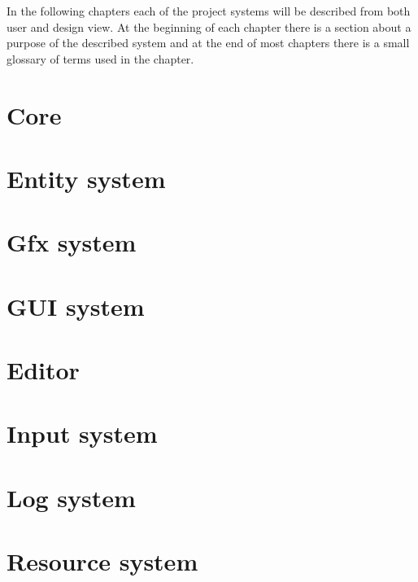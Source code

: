 \documentclass[a4paper, 12pt]{report}
\begin{document}
In the following chapters each of the project systems will be described from both user and design view. At the beginning of each chapter there is a section about a purpose of the described system and at the end of most chapters there is a small glossary of terms used in the chapter.

\chapter{Core}



\chapter{Entity system}



\chapter{Gfx system}



\chapter{GUI system}



\chapter{Editor}



\chapter{Input system}



\chapter{Log system}



\chapter{Resource system}


\end{document}
